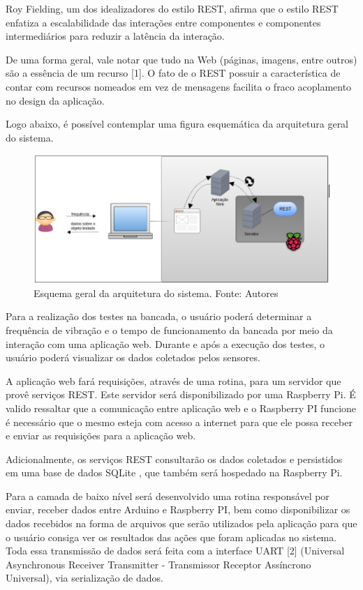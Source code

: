 Roy Fielding, um dos idealizadores do estilo REST,  afirma que o estilo REST enfatiza a escalabilidade das interações entre componentes e componentes intermediários para reduzir a latência da interação.

De uma forma geral, vale notar que tudo na Web (páginas, imagens, entre outros) são a essência de um recurso [1]. O fato de o REST  possuir a  característica de contar com recursos nomeados em vez de mensagens facilita o fraco acoplamento no design da aplicação.

Logo abaixo, é possível contemplar uma figura esquemática da arquitetura geral do sistema.

\begin{figure}[!ht]
\centering
\includegraphics[scale=0.5]{figuras/arquitetura_sistema.png}
\caption{Esquema geral da arquitetura do sistema. Fonte: Autores}
\label{fig:arquitetura_sistema}
\end{figure}

Para a realização dos testes na bancada, o usuário poderá determinar a frequência de vibração e o tempo de funcionamento da bancada por meio da interação com uma aplicação web. Durante e após a execução dos testes, o usuário poderá visualizar os dados coletados pelos sensores.

A aplicação web fará requisições, através de uma rotina, para um servidor que provê serviços REST. Este servidor será disponibilizado por uma Raspberry Pi. É valido ressaltar que a comunicação entre aplicação web e o Raspberry PI funcione é necessário que o mesmo esteja com acesso a internet para que ele possa receber e enviar as requisições para a aplicação web.

Adicionalmente, os serviços REST consultarão os dados coletados e persistidos em uma base de dados SQLite , que também será hospedado na Raspberry Pi.

Para a camada de baixo nível será desenvolvido uma rotina responsável por enviar, receber dados entre Arduino e Raspberry PI, bem como disponibilizar os dados recebidos na forma de arquivos que serão utilizados pela aplicação para que o usuário consiga ver os resultados das ações que foram aplicadas no sistema. Toda essa transmissão de dados será feita com a interface UART [2] (Universal Asynchronous Receiver Transmitter - Transmissor Receptor Assíncrono Universal), via serialização de dados.

